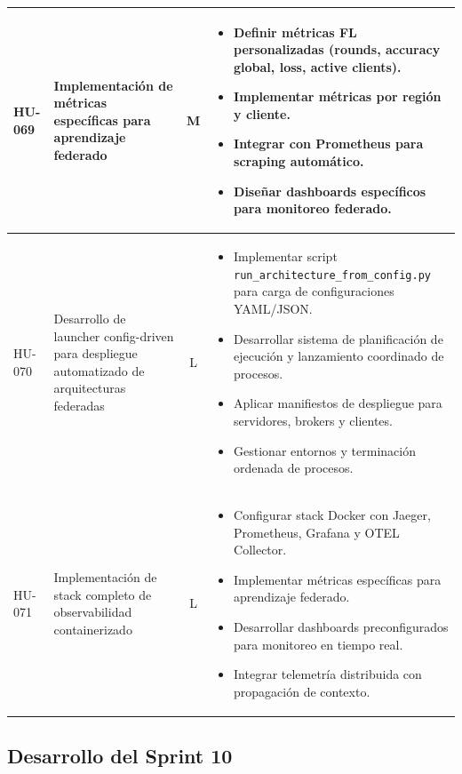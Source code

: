 \documentclass{report}
\begin{document}
\begin{table}[H]
\begin{tabular}{|l|p{4.8cm}|c|p{5.6cm}|}
HU-069&
Implementación de métricas específicas para aprendizaje federado &
M &
\begin{itemize}\setlength\itemsep{0.15em}
  \item Definir métricas FL personalizadas (rounds, accuracy global, loss, active clients).
  \item Implementar métricas por región y cliente.
  \item Integrar con Prometheus para scraping automático.
  \item Diseñar dashboards específicos para monitoreo federado.
\end{itemize}
\\ \hline

HU-070 &
Desarrollo de launcher config-driven para despliegue automatizado de arquitecturas federadas &
L &
\begin{itemize}\setlength\itemsep{0.15em}
  \item Implementar script \texttt{run\_architecture\_from\_config.py} para carga de configuraciones YAML/JSON.
  \item Desarrollar sistema de planificación de ejecución y lanzamiento coordinado de procesos.
  \item Aplicar manifiestos de despliegue para servidores, brokers y clientes.
  \item Gestionar entornos y terminación ordenada de procesos.
\end{itemize}
\\ \hline

HU-071 &
Implementación de stack completo de observabilidad containerizado &
L &
\begin{itemize}\setlength\itemsep{0.15em}
  \item Configurar stack Docker con Jaeger, Prometheus, Grafana y OTEL Collector.
  \item Implementar métricas específicas para aprendizaje federado.
  \item Desarrollar dashboards preconfigurados para monitoreo en tiempo real.
  \item Integrar telemetría distribuida con propagación de contexto.
\end{itemize}
\\ \hline

\end{tabular}
\end{table}

\subsection{Desarrollo del Sprint 10}
\end{document}
